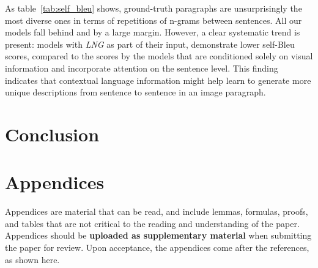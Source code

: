 \documentclass[11pt,a4paper]{article}
\newcommand{\R}{\mathbb{R}}
\begin{document}
As table~\ref{tab:self_bleu} shows, ground-truth paragraphs are unsurprisingly the most diverse ones in terms of repetitions of n-grams between sentences.
All our models fall behind and by a large margin.
However, a clear systematic trend is present: models with \textit{LNG} as part of their input, demonstrate lower self-Bleu scores, compared to the scores by the models that are conditioned solely on visual information and incorporate attention on the sentence level.
This finding indicates that contextual language information might help learn to generate more unique descriptions from sentence to sentence in an image paragraph.






\section{Conclusion}




\appendix

\section{Appendices}
\label{sec:appendix}
Appendices are material that can be read, and include lemmas, formulas, proofs, and tables that are not critical to the reading and understanding of the paper. 
Appendices should be \textbf{uploaded as supplementary material} when submitting the paper for review.
Upon acceptance, the appendices come after the references, as shown here.
\end{document}
